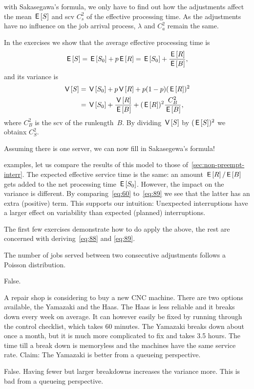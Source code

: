 \documentclass[stochastic-or.tex]{subfiles}
\begin{document}
 with Sakasegawa's formula, we only have to find out how the adjustments affect the  mean $\,\mathsf{E}\left[S\right]$ and scv $C_s^2$ of the effective processing time.
As the adjustments have no influence on the job arrival process, $\lambda$ and $C_a^{2}$ remain the same.

In the exercises we show that the average effective processing time is
\begin{equation} \label{eq:88}
 \,\mathsf{E}\left[S\right] = \,\mathsf{E}\left[S_0\right] + p \,\mathsf{E}\left[R\right] = \,\mathsf{E}\left[S_0\right] + \frac{\,\mathsf{E}\left[R\right]}{\,\mathsf{E}\left[B\right]},
\end{equation}
and its  variance is
\begin{equation}\label{eq:89}
  \begin{split}
 \,\mathsf{V}\left[S\right]
&= \,\mathsf{V}\left[S_0\right] + p\,\mathsf{V}\left[R\right] + p (1-p)(\,\mathsf{E}\left[R\right])^2 \\
&= \,\mathsf{V}\left[S_0\right] + \frac{\,\mathsf{V}\left[R\right]}{\,\mathsf{E}\left[B\right]} + (\,\mathsf{E}\left[R\right])^2\frac{C_B^2}{\,\mathsf{E}\left[B\right]},
 \end{split}
\end{equation}
where $C_B^2$ is the scv of the runlength~$B$.
By dividing $\,\mathsf{V}\left[S\right]$ by $(\,\mathsf{E}\left[S\right])^{2}$ we obtainx $C_{S}^{2}$.

Assuming there is one server,  we can now  fill in Sakasegewa's formula!


 examples, let us compare the results of this model to those of~\cref{sec:non-preempt-interr}.
The expected effective service time is the same: an amount $\,\mathsf{E}\left[R\right]/ \,\mathsf{E}\left[B\right]$ gets added to the net processing time $\,\mathsf{E}\left[S_0\right]$.
However, the impact on the variance is different.
By comparing~\cref{eq:60} to~\cref{eq:89} we see that the latter has an extra (positive) term.
This supports our intuition: Unexpected interruptions have a larger effect on variability than expected (planned) interruptions.

The first few exercises demonstrate how to do apply the above, the rest are concerned with deriving~\cref{eq:88} and \cref{eq:89}.

\begin{truefalse}
    The number of jobs served between two consecutive adjustments follows a Poisson distribution.
    \begin{solution}
        False.
    \end{solution}
\end{truefalse}

\begin{truefalse}
A repair shop is considering to buy a new CNC machine.
There are two options available, the Yamazaki and the Haas.
The Haas is less reliable and it breaks down every week on average.
It can however easily be fixed by running through the control checklist, which takes 60 minutes.
The Yamazaki breaks down about once a month, but it is much more complicated to fix and takes 3.5 hours.
The time till a break down is memoryless and the machines have the same service rate.
Claim: The Yamazaki is better from a queueing perspective.
    \begin{solution}
        False. Having fewer but larger breakdowns increases the variance more. This is bad from a queueing perspective.
    \end{solution}
\end{truefalse}
\end{document}
